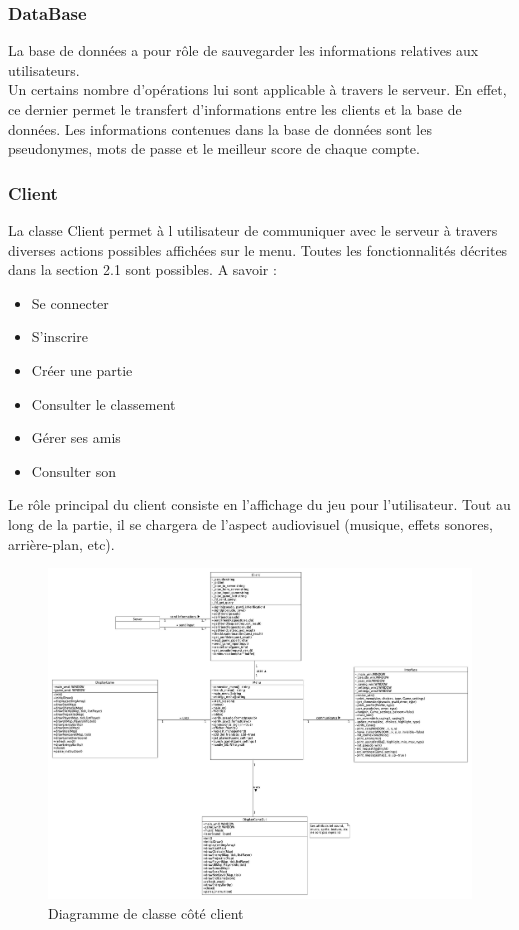 \documentclass[a4paper,12pt]{article}
\begin{document}
\subsubsection{DataBase}

La base de données a pour rôle de sauvegarder les informations relatives aux utilisateurs. \\
Un certains nombre d'opérations lui sont applicable à travers le serveur. En effet, ce dernier permet le transfert d'informations
entre les clients et la base de données. 
Les informations contenues dans la base de données sont les pseudonymes, mots de passe et le meilleur score de chaque compte. 

\subsubsection{Client}
La classe Client permet à l utilisateur de communiquer avec le serveur à travers diverses actions possibles affichées sur le menu.
Toutes les fonctionnalités décrites dans la section 2.1 sont possibles. A savoir : 
\begin{itemize}
    \item Se connecter
    \item S'inscrire
    \item Créer une partie
    \item Consulter le classement
    \item Gérer ses amis
    \item Consulter son \\
\end{itemize}
Le rôle principal du client consiste en l'affichage du jeu pour l'utilisateur. Tout au long de la partie, il se chargera de l'aspect audiovisuel (musique, effets sonores, arrière-plan, etc). 

\begin{figure}
\centering
\includegraphics[scale=0.3, angle=90]{images/newClientClassDiagram.jpg}
\caption{Diagramme de classe côté client}
\end{figure}
\newpage
\end{document}
